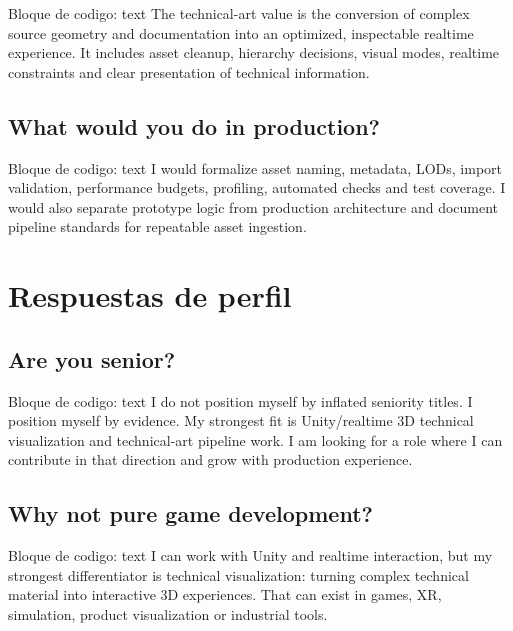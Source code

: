 \begin{mdcode}
Bloque de codigo: text
The technical-art value is the conversion of complex source geometry and documentation into an optimized, inspectable realtime experience. It includes asset cleanup, hierarchy decisions, visual modes, realtime constraints and clear presentation of technical information.
\end{mdcode}


\subsection{What would you do in production?}


\begin{mdcode}
Bloque de codigo: text
I would formalize asset naming, metadata, LODs, import validation, performance budgets, profiling, automated checks and test coverage. I would also separate prototype logic from production architecture and document pipeline standards for repeatable asset ingestion.
\end{mdcode}


\section{Respuestas de perfil}


\subsection{Are you senior?}


\begin{mdcode}
Bloque de codigo: text
I do not position myself by inflated seniority titles. I position myself by evidence. My strongest fit is Unity/realtime 3D technical visualization and technical-art pipeline work. I am looking for a role where I can contribute in that direction and grow with production experience.
\end{mdcode}


\subsection{Why not pure game development?}


\begin{mdcode}
Bloque de codigo: text
I can work with Unity and realtime interaction, but my strongest differentiator is technical visualization: turning complex technical material into interactive 3D experiences. That can exist in games, XR, simulation, product visualization or industrial tools.
\end{mdcode}


